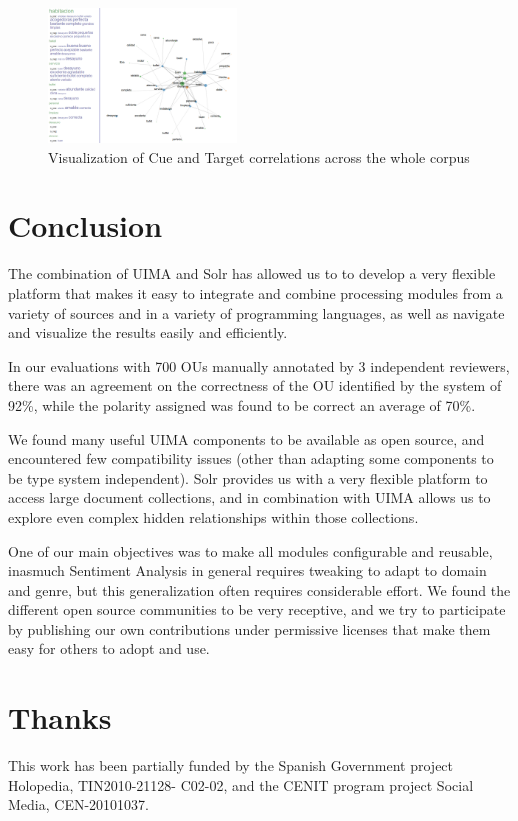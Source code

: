 \documentclass{llncs}
\begin{document}
\begin{figure}[ht!]
\centering
\includegraphics[width=5cm]{solr_visualization.png}
\caption{Visualization of Cue and Target correlations across the whole corpus} 
\label{fig:solr}
\end{figure}

\section{Conclusion}

The combination of UIMA and Solr has allowed us to to develop a very flexible platform that makes it easy to integrate and combine processing modules from a variety of sources and in a variety of programming languages, as well as navigate and visualize the results easily and efficiently.

In our evaluations with 700 OUs manually annotated by 3 independent reviewers, there was an agreement on the correctness of the OU identified by the system of 92\%, while the polarity assigned was found to be correct an average of 70\%.

We found many useful UIMA components to be available as open source, and encountered few compatibility issues (other than adapting some components to be type system independent). Solr provides us with a very flexible platform to access large document collections, and in combination with UIMA allows us to explore even complex hidden relationships within those collections.

One of our main objectives was to make all modules configurable and reusable, inasmuch Sentiment Analysis in general requires  tweaking to adapt to domain and genre, but this generalization often requires considerable effort. We found the different open source communities to be very receptive, and we try to participate by publishing our own contributions under permissive licenses that make them easy for others to adopt and use.

\section{Thanks}
This work has been partially funded by the Spanish
Government project Holopedia, TIN2010-21128-
C02-02, and the CENIT program project Social Media,
CEN-20101037.
\end{document}
